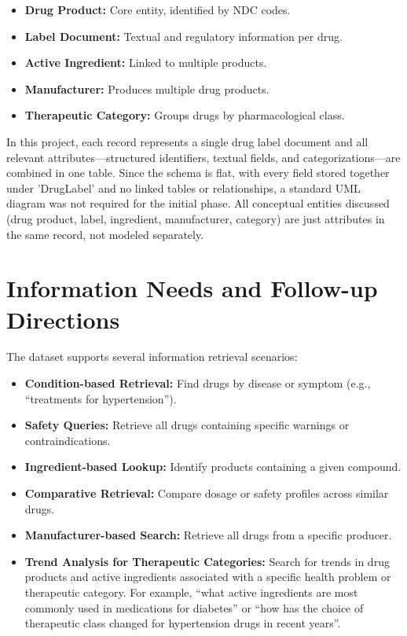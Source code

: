 \begin{itemize}
  \item \textbf{Drug Product:} Core entity, identified by NDC codes.
  \item \textbf{Label Document:} Textual and regulatory information per drug.
  \item \textbf{Active Ingredient:} Linked to multiple products.
  \item \textbf{Manufacturer:} Produces multiple drug products.
  \item \textbf{Therapeutic Category:} Groups drugs by pharmacological class.
\end{itemize}

In this project, each record represents a single drug label document and all relevant attributes—structured identifiers, textual fields, and categorizations—are combined in one table. Since the schema is flat, with every field stored together under 'DrugLabel' and no linked tables or relationships, a standard UML diagram was not required for the initial phase. All conceptual entities discussed (drug product, label, ingredient, manufacturer, category) are just attributes in the same record, not modeled separately.

\section{Information Needs and Follow-up Directions}
The dataset supports several information retrieval scenarios:

\begin{itemize}
  \item \textbf{Condition-based Retrieval:} Find drugs by disease or symptom (e.g., ``treatments for hypertension'').
  \item \textbf{Safety Queries:} Retrieve all drugs containing specific warnings or contraindications.
  \item \textbf{Ingredient-based Lookup:} Identify products containing a given compound.
  \item \textbf{Comparative Retrieval:} Compare dosage or safety profiles across similar drugs.
  \item \textbf{Manufacturer-based Search:} Retrieve all drugs from a specific producer.
  \item \textbf{Trend Analysis for Therapeutic Categories:} Search for trends in drug products and active ingredients associated with a specific health problem or therapeutic category. For example, ``what active ingredients are most commonly used in medications for diabetes'' or ``how has the choice of therapeutic class changed for hypertension drugs in recent years''.
\end{itemize}

